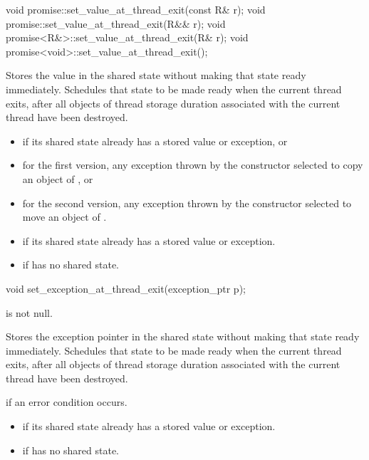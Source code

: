 %
\begin{itemdecl}
void promise::set_value_at_thread_exit(const R& r);
void promise::set_value_at_thread_exit(R&& r);
void promise<R&>::set_value_at_thread_exit(R& r);
void promise<void>::set_value_at_thread_exit();
\end{itemdecl}

\begin{itemdescr}
\pnum
\effects
Stores the value  in the shared state without making that
state ready immediately. Schedules that state to be made ready when the current
thread exits, after all objects of thread storage duration associated with the
current thread have been destroyed.

\pnum
\throws
\begin{itemize}
\item {} if its shared state
already has a stored value or exception, or
\item for the first version, any exception thrown by the constructor selected to copy an object of , or
\item for the second version, any exception thrown by the constructor selected to move an object of .
\end{itemize}

\pnum
\errors
\begin{itemize}
\item {} if its shared state
already has a stored value or exception.
\item {} if  has no shared state.
\end{itemize}
\end{itemdescr}

%
\begin{itemdecl}
void set_exception_at_thread_exit(exception_ptr p);
\end{itemdecl}

\begin{itemdescr}
\pnum
\expects
{} is not null.

\pnum
\effects
Stores the exception pointer  in the shared state without
making that state ready immediately. Schedules that state to be made ready when
the current thread exits, after all objects of thread storage duration
associated with the current thread have been destroyed.

\pnum
\throws
{} if an error condition occurs.

\pnum
\errors
\begin{itemize}
\item {} if its shared state
already has a stored value or exception.
\item {} if  has no shared state.
\end{itemize}
\end{itemdescr}

